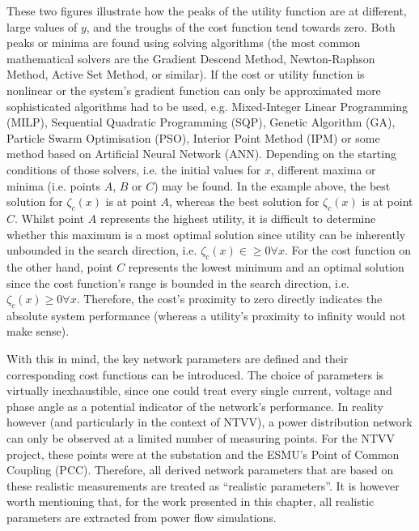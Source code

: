 These two figures illustrate how the peaks of the utility function are at different, large values of $y$, and the troughs of the cost function tend towards zero.
Both peaks or minima are found using solving algorithms (the most common mathematical solvers are the Gradient Descend Method, Newton-Raphson Method, Active Set Method, or similar).
If the cost or utility function is nonlinear or the system's gradient function can only be approximated more sophisticated algorithms had to be used, e.g. Mixed-Integer Linear Programming (MILP), Sequential Quadratic Programming (SQP), Genetic Algorithm (GA), Particle Swarm Optimisation (PSO), Interior Point Method (IPM) or some method based on Artificial Neural Network (ANN).
Depending on the starting conditions of those solvers, i.e. the initial values for $x$, different maxima or minima (i.e. points $A$, $B$ or $C$) may be found.
In the example above, the best solution for $\zeta_{c}(x)$ is at point $A$, whereas the best solution for $\zeta_{c}(x)$ is at point $C$.
Whilst point $A$ represents the highest utility, it is difficult to determine whether this maximum is a most optimal solution since utility can be inherently unbounded in the search direction, i.e. $\zeta_{c}(x) \in \geq 0 \forall x$.
For the cost function on the other hand, point $C$ represents the lowest minimum and an optimal solution since the cost function's range is bounded in the search direction, i.e. $\zeta_{c}(x) \geq 0 \forall x$.
Therefore, the cost's proximity to zero directly indicates the absolute system performance (whereas a utility's proximity to infinity would not make sense).

With this in mind, the key network parameters are defined and their corresponding cost functions can be introduced.
The choice of parameters is virtually inexhaustible, since one could treat every single current, voltage and phase angle as a potential indicator of the network's performance.
In reality however (and particularly in the context of NTVV), a power distribution network can only be observed at a limited number of measuring points.
For the NTVV project, these points were at the substation and the ESMU's Point of Common Coupling (PCC).
Therefore, all derived network parameters that are based on these realistic measurements are treated as ``realistic parameters''.
It is however worth mentioning that, for the work presented in this chapter, all realistic parameters are extracted from power flow simulations.

